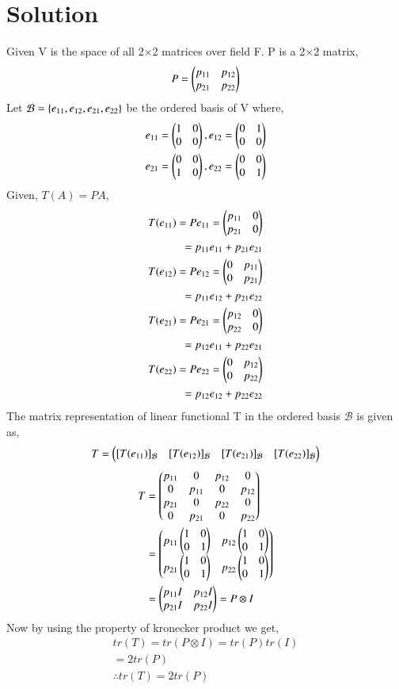 \documentclass[journal,12pt,twocolumn]{IEEEtran}
\begin{document}
\section{Solution}
Given V is the space of all 2$\times$2 matrices over field F. P is a 2$\times$2 matrix, 
\begin{align}
    P = \begin{pmatrix}p_{11}&p_{12}\\ p_{21}&p_{22}\end{pmatrix}
\end{align}
Let $\mathcal{B}=\left\{e_{11}, e_{12}, e_{21}, e_{22}\right\}$ be the ordered basis of V where, 
\begin{align}
    e_{11}=\begin{pmatrix}1&0\\0&0\end{pmatrix}, e_{12}=\begin{pmatrix}0&1\\0&0\end{pmatrix}\\
    e_{21}=\begin{pmatrix}0&0\\1&0\end{pmatrix}, e_{22}=\begin{pmatrix}0&0\\0&1\end{pmatrix}
\end{align}
Given, $T(A)=PA$, 
\begin{align}
    T(e_{11}) = Pe_{11}
    = \begin{pmatrix}p_{11}&0\\p_{21}&0\end{pmatrix} \\
    = p_{11}e_{11} + p_{21}e_{21} \\
    T(e_{12}) = Pe_{12} = \begin{pmatrix}0&p_{11}\\0&p_{21}\end{pmatrix}\\
    = p_{11}e_{12} + p_{21}e_{22} \\
    T(e_{21}) = Pe_{21} = 
    \begin{pmatrix}p_{12}&0\\p_{22}&0\end{pmatrix}\\
    = p_{12}e_{11} + p_{22}e_{21} \\
    T(e_{22}) = Pe_{22} = 
    \begin{pmatrix}0&p_{12}\\0&p_{22}\end{pmatrix} \\
    = p_{12}e_{12} + p_{22}e_{22}
\end{align}
The matrix representation of linear functional T in the ordered basis $\mathcal{B}$ is given as,
\begin{align}
    T = \begin{pmatrix}[T(e_{11})]_{\mathcal{B}} & [T(e_{12})]_{\mathcal{B}} & [T(e_{21})]_{\mathcal{B}} & [T(e_{22})]_{\mathcal{B}}\end{pmatrix}
\end{align}
\begin{align}
    T &= \begin{pmatrix}p_{11}&0&p_{12}&0\\0&p_{11}&0&p_{12}\\p_{21}&0&p_{22}&0\\0&p_{21}&0&p_{22}\end{pmatrix} \\
    &= \begin{pmatrix}p_{11}\begin{pmatrix}1&0\\0&1\end{pmatrix} & p_{12}\begin{pmatrix}1&0\\0&1\end{pmatrix} \\ p_{21}\begin{pmatrix}1&0\\0&1\end{pmatrix} & p_{22}\begin{pmatrix}1&0\\0&1\end{pmatrix}\end{pmatrix} \\
    &= \begin{pmatrix}p_{11}I & p_{12}I \\ p_{21}I & p_{22}I\end{pmatrix} = P \otimes I
\end{align}
Now by using the property of kronecker product we get, 
\begin{align}
    tr(T) = tr(P\otimes I)
    = tr(P)tr(I)\\
    = 2tr(P) \\
    \therefore tr(T)= 2tr(P)
\end{align}
\end{document}

